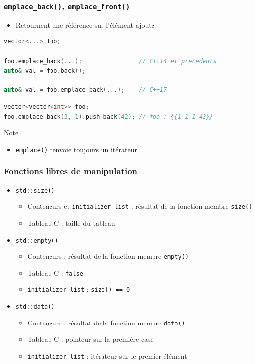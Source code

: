 \documentclass[C++.tex]{subfiles}
\begin{document}
\begin{frame}[fragile]
	\frametitle{\lstinline|emplace_back()|, \lstinline|emplace_front()|}
	\begin{itemize}
		\item Retournent une référence sur l'élément ajouté
	\end{itemize}

	\begin{lstlisting}[language=C++]
vector<...> foo;

foo.emplace_back(...);                // C++14 et precedents
auto& val = foo.back();

auto& val = foo.emplace_back(...);    // C++17\end{lstlisting}

	\begin{lstlisting}[language=C++]
vector<vector<int>> foo;
foo.emplace_back(3, 1).push_back(42); // foo : {{1 1 1 42}}\end{lstlisting}

	\begin{block}{Note}
	\begin{itemize}
		\item \lstinline|emplace()| renvoie toujours un itérateur
	\end{itemize}
	\end{block}
\end{frame}

\begin{frame}[fragile]
	\frametitle{Fonctions libres de manipulation}
	\begin{itemize}
		\item \lstinline|std::size()|
		\begin{itemize}
			\item Conteneurs et \lstinline|initializer_list| : résultat de la fonction membre \lstinline|size()|
			\item Tableau C : taille du tableau
		\end{itemize} 

		\item \lstinline|std::empty()|
		\begin{itemize}
			\item Conteneurs : résultat de la fonction membre \lstinline|empty()|
			\item Tableau C : \lstinline|false|
			\item \lstinline|initializer_list| : \lstinline|size() == 0|
		\end{itemize}

		\item \lstinline|std::data()|
		\begin{itemize}
			\item Conteneurs : résultat de la fonction membre \lstinline|data()|
			\item Tableau C : pointeur sur la première case
			\item \lstinline|initializer_list| : itérateur sur le premier élément
		\end{itemize}
	\end{itemize}	
\end{frame}
\end{document}
